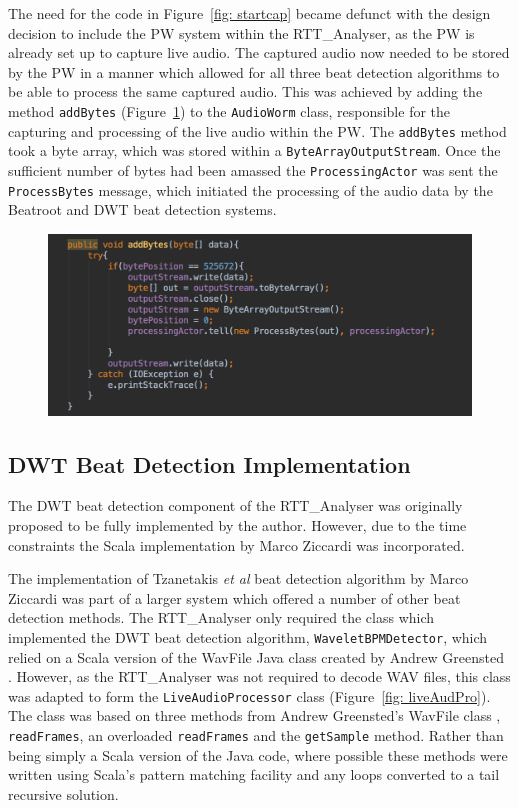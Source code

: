 \documentclass[a4paper, 11pt]{article}
\begin{document}
The need for the code in Figure~\ref{fig: startcap} became defunct with the design decision to include the PW system within the RTT\_Analyser, as the PW is already set up to capture live audio. The captured audio now needed to be stored by the PW in a manner which allowed for all three beat detection algorithms to be able to process the same captured audio. This was achieved by adding the method \texttt{addBytes} (Figure~\ref{fig: addBytes}) to the \texttt{AudioWorm} class, responsible for the capturing and processing of the live audio within the PW. The \texttt{addBytes} method took a byte array, which was stored within a \texttt{ByteArrayOutputStream}. Once the sufficient number of bytes had been amassed the \texttt{ProcessingActor} was sent the \texttt{ProcessBytes} message, which initiated the processing of the audio data by the Beatroot and DWT beat detection systems.

\begin{figure}[h]
	\centering
	\includegraphics[scale=0.25]{images/addBytes.jpg}
	\caption{}
	\label{fig: addBytes}
\end{figure}

\subsection{DWT Beat Detection Implementation}
The DWT beat detection component of the RTT\_Analyser was originally proposed to be fully implemented by the author. However, due to the time constraints the Scala implementation by Marco Ziccardi \cite{marcoZin} was incorporated.

The implementation of Tzanetakis \textit{et al} beat detection algorithm by Marco Ziccardi \cite{marcoZin} was part of a larger system which offered a number of other beat detection methods. The RTT\_Analyser only required the class which implemented the DWT beat detection algorithm, \texttt{WaveletBPMDetector}, which relied on a Scala version of the WavFile Java class created by Andrew Greensted \cite{green}. However, as the RTT\_Analyser was not required to decode WAV files, this class was adapted to form the \texttt{LiveAudioProcessor} class (Figure~\ref{fig: liveAudPro}). The class was based on three methods from Andrew Greensted's WavFile class \cite{green}, \texttt{readFrames}, an overloaded \texttt{readFrames} and the \texttt{getSample} method. Rather than being simply a Scala version of the Java code, where possible these methods were written using Scala's pattern matching facility and any loops converted to a tail recursive solution.\par
\end{document}
